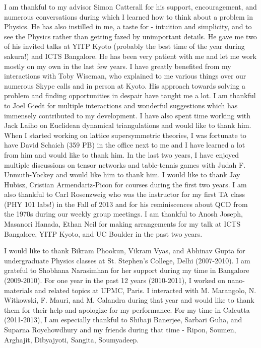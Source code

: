 \vspace*{2em}
I am thankful to my advisor Simon Catterall for his support, encouragement, and numerous conversations during which I learned how to 
think about a problem in Physics. He has also instilled in me, a taste for - intuition and simplicity, 
and to see the Physics rather than getting fazed by unimportant details. 
He gave me two of his invited talks at YITP Kyoto (probably the best time of the year during sakura!) 
and ICTS Bangalore. He has been very patient with me and let me work mostly on my own in the last few years. 
I have greatly benefited from my interactions with Toby Wiseman, who explained to me various things
over our numerous Skype calls and in person at Kyoto. His approach towards solving a problem and finding 
opportunities in despair have taught me a lot. I am thankful to Joel Giedt for multiple interactions 
and wonderful suggestions which has immensely contributed to my development.  
I have also spent time working with Jack Laiho on Euclidean dynamical triangulations and would like to thank
him. When I started working on lattice supersymmetric theories, 
I was fortunate to have David Schaich (359 PB) in the office next to me and I 
have learned a lot from him and would like to thank him. In the last two years, I have enjoyed multiple discussions on tensor networks and table-tennis 
games with Judah F. Unmuth-Yockey and would like him to thank him. I would like to thank Jay Hubisz, Cristian Armendariz-Picon 
for courses during the first two years. I am also thankful to Carl Rosenzweig who was the instructor for my first TA class 
(PHY 101 labs!) in the Fall of 2013 and for his reminiscences about QCD from the 1970s during our weekly group meetings.
I am thankful to Anosh Joseph, Masanori Hanada, Ethan Neil for
making arrangements for my talk at ICTS Bangalore, YITP Kyoto, and UC Boulder in the past two years.  

I would like to thank Bikram Phookun, Vikram Vyas, and Abhinav Gupta for undergraduate Physics classes at  
St. Stephen's College, Delhi (2007-2010). I am grateful to Shobhana Narasimhan for her support during my time
in Bangalore (2009-2010). For one year in the past 12 years (2010-2011), 
I worked on nano-materials and related topics at UPMC, Paris.
I interacted with M. Marangolo, N. Witkowski, F. Mauri, and M. Calandra during that year and would like
to thank them for their help and apologize for my performance. For my time in Calcutta (2011-2013), 
I am especially thankful to Shibaji Banerjee, Sarbari Guha, and Suparna Roychowdhury and my friends during that time - 
Ripon, Soumen, Arghajit, Dibyajyoti, Sangita, Soumyadeep. 

